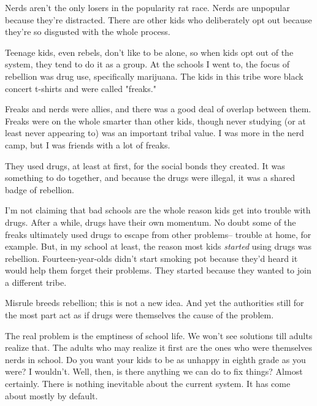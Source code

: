 Nerds
                  aren't the only losers in the popularity rat race. Nerds are
                  unpopular because they're distracted. There are other kids who
                  deliberately opt out because they're so disgusted with the
                  whole process.

Teenage kids, even rebels, don't
                  like to be alone, so when kids opt out of the system, they
                  tend to do it as a group. At the schools I went to, the focus
                  of rebellion was drug use, specifically marijuana. The kids in
                  this tribe wore black concert t-shirts and were called
                  "freaks."

Freaks and nerds were allies, and there
                  was a good deal of overlap between them. Freaks were on the
                  whole smarter than other kids, though never studying (or at
                  least never appearing to) was an important tribal value. I was
                  more in the nerd camp, but I was friends with a lot of
                  freaks.

They used drugs, at least at first, for the
                  social bonds they created. It was something to do together,
                  and because the drugs were illegal, it was a shared badge of
                  rebellion.

I'm not claiming that bad schools are
                  the whole reason kids get into trouble with drugs. After a
                  while, drugs have their own momentum. No doubt some of the
                  freaks ultimately used drugs to escape from other problems--
                  trouble at home, for example. But, in my school at least, the
                  reason most kids \emph{started} using drugs was rebellion.
                  Fourteen-year-olds didn't start smoking pot because they'd
                  heard it would help them forget their problems. They started
                  because they wanted to join a different tribe.

Misrule
                  breeds rebellion; this is not a new idea. And yet the
                  authorities still for the most part act as if drugs were
                  themselves the cause of the problem.




                  The real problem is the emptiness of school life. We won't see
                  solutions till adults realize that. The adults who may realize
                  it first are the ones who were themselves nerds in school. Do
                  you want your kids to be as unhappy in eighth grade as you
                  were? I wouldn't. Well, then, is there anything we can do to
                  fix things? Almost certainly. There is nothing inevitable
                  about the current system. It has come about mostly by
                  default.

